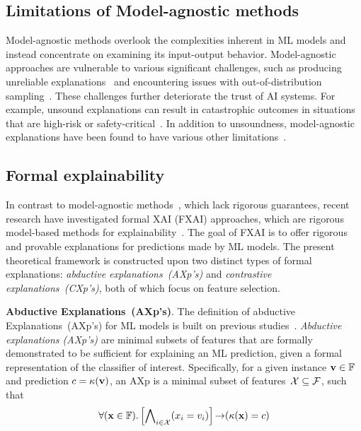 \subsection{Limitations of Model-agnostic methods} \label{sec:malimit}

Model-agnostic methods overlook the complexities inherent in ML models
and instead concentrate on examining its input-output behavior.
%
Model-agnostic approaches are vulnerable to various significant challenges, 
such as producing unreliable explanations~\cite{inms-corr19,nsmims-sat19,ignatiev-ijcai20,msi-aaai22} 
and encountering issues with out-of-distribution sampling~\cite{lakkaraju-aies20a,lb-aies20,yis-corr23,yfis-corr23}.
%
%
These challenges further deteriorate the trust of AI systems.
%
For example, unsound explanations can result in catastrophic outcomes in situations
that are high-risk or safety-critical~\cite{rudin-nature22,rudin-natmi19,vw-pt21,raai-sp19,dmbt-comp17,hcw-chb21}.
% 
In addition to unsoundness, model-agnostic explanations have been found to have various 
other limitations~\cite{lakkaraju-aies20a,lb-aies20,dbjw-ecai20,kvsf-icml20,huang-corr23}.

\subsection{Formal explainability} \label{sec:fxai}

In contrast to model-agnostic methods~\cite{guestrin-kdd16,lundberg-nips17,guestrin-aaai18,guidotti-acmcs19}, 
which lack rigorous guarantees, recent research have investigated formal XAI (FXAI) approaches,
which are rigorous model-based methods for explainability~\cite{ignatiev-ijcai20,msi-aaai22,ms-rw22,msi-fai23,iims-jair22}.
%
The goal of FXAI is to offer rigorous and provable explanations for predictions made by ML models.
%
The present theoretical framework is constructed upon two distinct types of formal explanations:
\emph{abductive explanations~(AXp's)} and \emph{contrastive explanations~(CXp's)},
both of which focus on feature selection.

\textbf{Abductive Explanations~(AXp's)}. 
The definition of abductive Explanations~(AXp's) for ML models is built on previous 
studies~\cite{darwiche-ijcai18,inms-aaai19,darwiche-ecai20,marquis-kr20,msi-aaai22}.
%
\emph{Abductive explanations (AXp's)} are minimal subsets of features that are formally 
demonstrated to be sufficient for explaining an ML prediction, 
given a formal representation of the classifier of interest.
%
Specifically, for a given instance $\mathbf{v} \in \mathbb{F}$ and 
prediction $c = \kappa(\mathbf{v})$, an AXp is a minimal subset of features~${\mathcal{X}} \subseteq {\mathcal{F}}$,
such that
\begin{equation}\label{eq:axp}
	\forall(\mathbf{x} \in \mathbb{F}).\left[\bigwedge\nolimits_{i \in {\mathcal{X}}} 
	(x_i = v_i)\right] \operatorname*{\rightarrow} (\kappa(\mathbf{x}) = c)
\end{equation}

